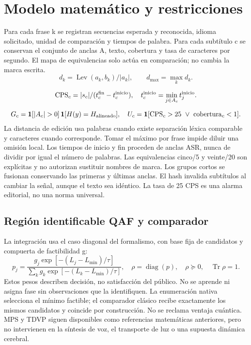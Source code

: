\documentclass[10pt,a4paper]{article}
\begin{document}
\section{Modelo matemático y restricciones}
Para cada frase k se registran secuencias esperada y reconocida, idioma solicitado, unidad de comparación y tiempos de palabra. Para cada subtítulo c se conservan el conjunto de anclas A, texto, cobertura y tasa de caracteres por segundo. El mapa de equivalencias solo actúa en comparación; no cambia la marca escrita.
\begin{equation}d_k=\operatorname{Lev}(a_k,b_k)/|a_k|,\qquad d_{\max}=\max_k d_k.\end{equation}

\begin{equation}\mathrm{CPS}_c=|s_c|/(t_c^{\rm fin}-t_c^{\rm inicio}),\quad t_c^{\rm inicio}=\min_{j\in A_c}t_j^{\rm inicio}.\end{equation}

\begin{equation}G_c=\mathbf1[|A_c|>0]\,\mathbf1[H(y)=H_{\rm alineado}],\quad U_c=\mathbf1[\mathrm{CPS}_c>25\ \lor\ \mathrm{cobertura}_c<1].\end{equation}
La distancia de edición usa palabras cuando existe separación léxica comparable y caracteres cuando corresponde. Tomar el máximo por frase impide diluir una omisión local. Los tiempos de inicio y fin proceden de anclas ASR, nunca de dividir por igual el número de palabras. Las equivalencias cinco/5 y veinte/20 son explícitas y no autorizan sustituir nombres de marca. Los grupos cortos se fusionan conservando las primeras y últimas anclas. El hash invalida subtítulos al cambiar la señal, aunque el texto sea idéntico. La tasa de 25 CPS es una alarma editorial, no una norma universal.
\subsection{Región identificable QAF y comparador}
La integración usa el caso diagonal del formalismo, con base fija de candidatos y compuerta de factibilidad g:
\begin{equation}
p_j=\frac{g_j\exp[-(L_j-L_{\min})/\tau]}{\sum_k g_k\exp[-(L_k-L_{\min})/\tau]},\quad\rho=\operatorname{diag}(p),\quad\rho\succeq0,\quad\operatorname{Tr}\rho=1.
\end{equation}
Estos pesos describen decisión, no satisfacción del público. No se aprende ni asigna fase sin observaciones que la identifiquen. La enumeración nativa selecciona el mínimo factible; el comparador clásico recibe exactamente los mismos candidatos y coincide por construcción. No se reclama ventaja cuántica. MPS y TDVP siguen disponibles como referencias matemáticas anteriores, pero no intervienen en la síntesis de voz, el transporte de luz o una supuesta dinámica cerebral.
\end{document}
